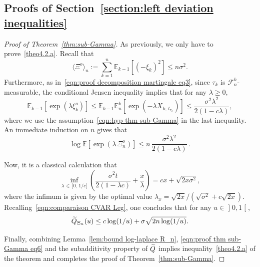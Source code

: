 \documentclass[AHL,Unicode,longabstracts,published]{cedram}
\newcommand{\bE}{\mathbb{E}}
\newcommand{\cF}{\mathcal{F}}
\newcommand{\intervalleoo}[2]{\mathopen{]} #1\mathclose{}\mathpunct{},#2\mathclose{[}}
\let\oldtilde\tilde
\renewcommand*{\tilde}[1]{\mathchoice{\widetilde{#1}}{\widetilde{#1}}{\oldtilde{#1}}{\oldtilde{#1}}}
\begin{document}
\subsection{Proofs of Section~\ref{section:left deviation inequalities}}
\begin{proof}[Proof of Theorem~\ref{thm:sub-Gamma}] As previously, we only have to prove~\eqref{theo4.2.a}.
Recall that
\begin{equation}\label{eqn:proof thm sub-Gamma eq1}
\langle\Xi^o\rangle_n:=\sum_{k=1}^n\bE_{k-1}\left[(-\xi_k)^{2}\right]\leq n\sigma^2.
\end{equation}
Furthermore, as in~\eqref{eqn:proof decomposition martingale eq3}, since $\tau_k$ is $\cF_n^k$-measurable, the conditional Jensen inequality implies that for any $\lambda\geq 0$,
\begin{equation}\label{eqn:proof thm sub-Gamma eq2}
\bE_{k-1}\left[\exp(\lambda\xi_k^o)\right]\leq \bE_{k-1}\bE _n^k\left[\exp\left(-\lambda X_{k,\,t_{\tau_k}}\right)\right]\leq\frac{\sigma^2\lambda^2}{2(1-c\lambda)},
\end{equation}
where we use the assumption~\eqref{eqn:hyp thm sub-Gamma} in the last inequality. An immediate induction on $n$ gives that
\begin{equation}\label{eqn:proof thm sub-Gamma eq4}
\log\bE\left[\exp(\lambda\,\Xi_n^o)\right]\leq n\,\frac{\sigma^2\lambda^2}{2(1-c\lambda)}\,.
\end{equation}


Now, it is a classical calculation that
\begin{equation}\label{eqn:proof thm sub-Gamma eq5}
\inf_{\lambda\,\in\,]0,\,1/c[}\left(\frac{\sigma^2 t}{2(1-\lambda c)}+\frac x\lambda\right)=cx+\sqrt{2x\sigma^2},
\end{equation}
where the infimum is given by the optimal value $\lambda_x=\sqrt{2x}/(\sqrt{\sigma^2}+c\sqrt{2x})$. Recalling~\eqref{eqn:comparaison CVAR Leg}, one concludes that for any $u\in\intervalleoo 01$,
\begin{equation}\label{eqn:proof thm sub-Gamma eq6}
\tilde Q_{\Xi_n}(u)\leq c\log(1/u)+\sigma\sqrt{2n\log(1/u)}.
\end{equation}


Finally, combining Lemma~\ref{lem:bound log-laplace R_n}, \eqref{eqn:proof thm sub-Gamma eq6} and the subadditivity property of $\tilde Q$ implies inequality~\eqref{theo4.2.a} of the theorem and completes the proof of Theorem~\ref{thm:sub-Gamma}.
\end{proof}
\end{document}
